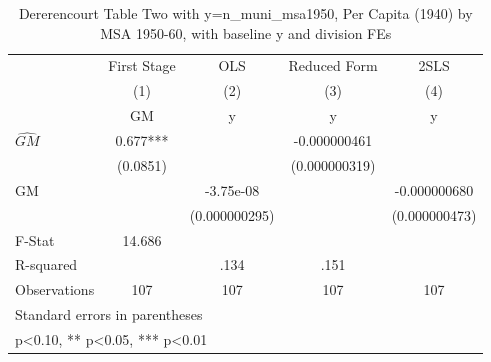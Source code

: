 \begin{table}[htbp]\centering
\def\sym#1{\ifmmode^{#1}\else\(^{#1}\)\fi}
\caption{Dererencourt Table Two with y=n\_muni\_msa1950, Per Capita (1940) by MSA 1950-60, with baseline y and division FEs}
\begin{tabular}{l*{4}{c}}
\toprule
                    & First Stage   &         OLS   &Reduced Form   &        2SLS   \\
                    &\multicolumn{1}{c}{(1)}&\multicolumn{1}{c}{(2)}&\multicolumn{1}{c}{(3)}&\multicolumn{1}{c}{(4)}\\
                    &\multicolumn{1}{c}{GM}&\multicolumn{1}{c}{y}&\multicolumn{1}{c}{y}&\multicolumn{1}{c}{y}\\
\midrule
$\hat{GM}$          &       0.677***&               &-0.000000461   &               \\
                    &    (0.0851)   &               &(0.000000319)   &               \\
\addlinespace
GM                  &               &   -3.75e-08   &               &-0.000000680   \\
                    &               &(0.000000295)   &               &(0.000000473)   \\
\midrule
F-Stat              &      14.686   &               &               &               \\
R-squared           &               &        .134   &        .151   &               \\
Observations        &         107   &         107   &         107   &         107   \\
\bottomrule
\multicolumn{5}{l}{\footnotesize Standard errors in parentheses}\\
\multicolumn{5}{l}{\footnotesize * p<0.10, ** p<0.05, *** p<0.01}\\
\end{tabular}
\end{table}
